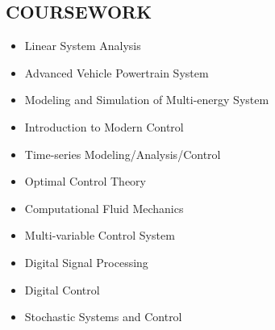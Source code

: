 \documentclass[margin, 9pt]{res} %
\begin{document}
\begin{resume}

\section{COURSEWORK}

\vspace*{-2pt}
\begin{itemize}[leftmargin=*] \itemsep -2pt
	\item Linear System Analysis
	\item Advanced Vehicle Powertrain System
	\item Modeling and Simulation of Multi-energy System
	\item Introduction to Modern Control
	\item Time-series Modeling/Analysis/Control
	\item Optimal Control Theory
	\item Computational Fluid Mechanics
    \item Multi-variable Control System
    \item Digital Signal Processing
    \item Digital Control
    \item Stochastic Systems and Control
\end{itemize}


\end{resume}
\end{document}
